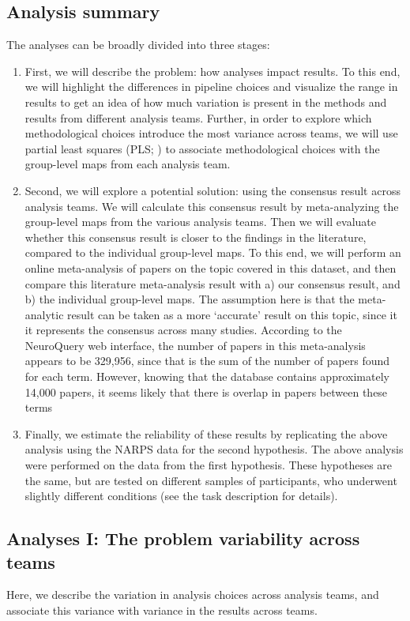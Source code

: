 \documentclass[a4paper,doc,natbib]{apa6}
\begin{document}
\subsection{Analysis summary}
The analyses can be broadly divided into three stages:
\begin{enumerate}
\item First, we will describe the problem: how analyses impact results. To this end, we will highlight the differences in pipeline choices and visualize the range in results to get an idea of how much variation is present in the methods and results from different analysis teams. Further, in order to explore which methodological choices introduce the most variance across teams, we will use partial least squares (PLS; \citealp{mcintosh2013multivariate, mcintosh2004partial}) to associate methodological choices with the group-level maps from each analysis team. 
\item Second, we will explore a potential solution: using the consensus result across analysis teams. We will calculate this consensus result by meta-analyzing the group-level maps from the various analysis teams. Then we will evaluate whether this consensus result is closer to the findings in the literature, compared to the individual group-level maps. To this end, we will perform an online meta-analysis of papers on the topic covered in this dataset, and then compare this literature meta-analysis result with a) our consensus result, and b) the individual group-level maps. The assumption here is that the meta-analytic result can be taken as a more `accurate' result on this topic, since it it represents the consensus across many studies. According to the NeuroQuery web interface, the number of papers in this meta-analysis appears to be 329,956, since that is the sum of the number of papers found for each term. However, knowing that the database contains approximately 14,000 papers, it seems likely that there is overlap in papers between these terms
\item Finally, we estimate the reliability of these results by replicating the above analysis using the NARPS data for the second hypothesis. The above analysis were performed on the data from the first hypothesis. These hypotheses are the same, but are tested on different samples of participants, who underwent slightly different conditions (see the task description for details).
\end{enumerate}

\subsection{Analyses I: The problem variability across teams}
Here, we describe the variation in analysis choices across analysis teams, and associate this variance with variance in the results across teams. 
\end{document}
